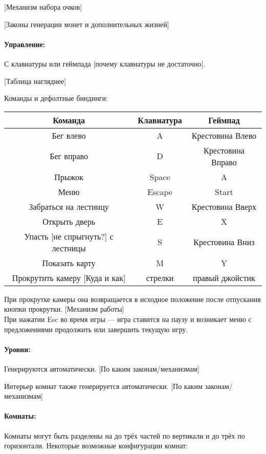 \documentclass[12pt,a4paper]{article}
\begin{document}
{\color{red} [Механизм набора очков]}

{\color{red} [Законы генерации монет и дополнительных жизней]}

\paragraph{Управление:}
С клавиатуры или геймпада {\color{red} [почему клавиатуры не достаточно]}.

{\color{blue} [Таблица нагляднее]}

Команды и дефолтные биндинги:\\
\begin{tabular}{|c|c|c|}
\hline
Команда & Клавиатура & Геймпад\\
\hline
Бег влево & A & Крестовина Влево \\
\hline
Бег вправо & D & Крестовина Вправо \\
\hline
Прыжок & Space & A \\
\hline
Меню & Escape & Start \\
\hline
Забраться на лестинцу & W & Крестовина Вверх \\
\hline
Открыть дверь & E & X \\
\hline
Упасть {\color{red} [не спрыгнуть?]} с лестницы & S & Крестовина Вниз \\
\hline
Показать карту & M & Y \\
\hline
Прокрутить камеру {\color{red} [Куда и как]} & стрелки & правый джойстик \\
\hline
\end{tabular}

При прокрутке камеры она возвращается в исходное положение после отпускания кнопки прокрутки. {\color{red} [Механизм работы]}\\

При нажатии Esc во время игры --- игра ставится на паузу и возникает меню с предложениями продолжить или завершить текущую игру.

\paragraph{Уровни:}
Генерируются автоматически. {\color{red} [По каким законам/механизмам]}

Интерьер комнат также генерируется автоматически. {\color{red} [По каким законам/механизмам]}

\paragraph{Комнаты:}
Комнаты могут быть разделены на до трёх частей по вертикали и до трёх по горизонтали. Некоторые возможные конфигурации комнат:\\
\end{document}
